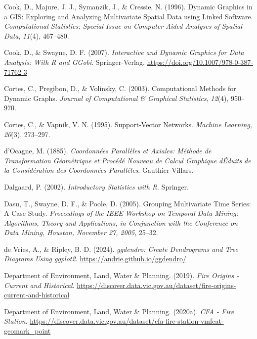 \documentclass[
  letterpaper,
]{krantz}
\newlength{\cslhangindent}
\newenvironment{CSLReferences}[2] %
 {\begin{list}{}{%
  \setlength{\itemindent}{0pt}
  \setlength{\leftmargin}{0pt}
  \setlength{\parsep}{0pt}
  \ifodd #1
   \setlength{\leftmargin}{\cslhangindent}
   \setlength{\itemindent}{-1\cslhangindent}
  \fi
  \setlength{\itemsep}{#2\baselineskip}}}
 {\end{list}}
\begin{document}
\begin{CSLReferences}{1}{0}
Cook, D., Majure, J. J., Symanzik, J., \& Cressie, N. (1996). {D}ynamic
{G}raphics in a {GIS}: {E}xploring and {A}nalyzing {M}ultivariate
{S}patial {D}ata using {L}inked {S}oftware. \emph{Computational
Statistics: Special Issue on Computer Aided Analyses of Spatial Data},
\emph{11}(4), 467--480.

Cook, D., \& Swayne, D. F. (2007). \emph{Interactive and {D}ynamic
{G}raphics for {D}ata {A}nalysis: {W}ith {R} and {GGobi}}.
Springer-Verlag. \url{https://doi.org/10.1007/978-0-387-71762-3}

Cortes, C., Pregibon, D., \& Volinsky, C. (2003). Computational
{M}ethods for {D}ynamic {G}raphs. \emph{Journal of Computational \&
Graphical Statistics}, \emph{12}(4), 950--970.

Cortes, C., \& Vapnik, V. N. (1995). Support-{V}ector {N}etworks.
\emph{Machine Learning}, \emph{20}(3), 273--297.

{d'Ocagne, M.} (1885). \emph{{C}oordonnées {P}arallèles et {A}xiales:
{M}éthode de {T}ransformation {G}éométrique et {P}rocédé {N}ouveau de
{C}alcul {G}raphique dÉduits de la {C}onsidération des {C}oordonnées
{P}aralléles}. Gauthier-Villars.

Dalgaard, P. (2002). \emph{Introductory {S}tatistics with {R}}.
Springer.

Dasu, T., Swayne, D. F., \& Poole, D. (2005). Grouping {M}ultivariate
{T}ime {S}eries: A {C}ase {S}tudy. \emph{Proceedings of the IEEE
Workshop on {T}emporal {D}ata {M}ining: {A}lgorithms, {T}heory and
{A}pplications, in Conjunction with the Conference on Data Mining,
Houston, November 27, 2005}, 25--32.

{de Vries, A., \& Ripley, B. D.} (2024). \emph{{ggdendro}: {C}reate
{D}endrograms and {T}ree {D}iagrams {U}sing {ggplot2}}.
\url{https://andrie.github.io/ggdendro/}

Department of Environment, Land, Water \& Planning. (2019). \emph{{Fire
Origins - Current and Historical}}.
\url{https://discover.data.vic.gov.au/dataset/fire-origins-current-and-historical}

Department of Environment, Land, Water \& Planning. (2020a). \emph{{CFA
- Fire Station}}.
\url{https://discover.data.vic.gov.au/dataset/cfa-fire-station-vmfeat-geomark_point}


\end{CSLReferences}
\end{document}

